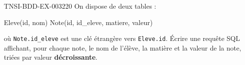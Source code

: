 \begin{exercice}{TNSI-BDD-EX-003}{2}{20}
On dispose de deux tables :
\begin{sql}
Eleve(id, nom)
Note(id, id_eleve, matiere, valeur)
\end{sql}
où \texttt{Note.id\_eleve} est une clé étrangère vers \texttt{Eleve.id}. Écrire une requête SQL affichant, pour chaque note, le nom de l'élève, la matière et la valeur de la note, triées par valeur \textbf{décroissante}.
\end{exercice}

